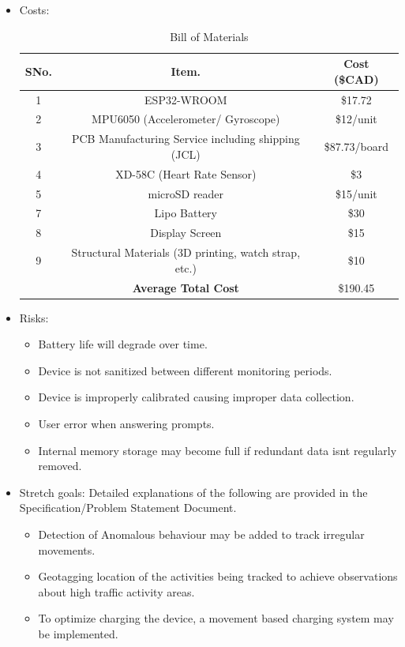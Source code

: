 \documentclass[12pt]{article}
\begin{document}
\begin{itemize}
\item Costs:
		\begin{center}
		\begin{table}[H]
		\caption{\label{bom}Bill of Materials}  
			\begin{tabular}{ |c|c|c| } 
				 \hline
				 	\textbf{SNo.} &  \textbf{Item.} &  \textbf{Cost (\$CAD)} \\ 
				 \hline
				 	1 & ESP32-WROOM											& \$17.72 \\ 
				 \hline		
				 	2 & MPU6050 (Accelerometer/ Gyroscope)						& \$12/unit \\ 
				 \hline
					3 & PCB Manufacturing Service including shipping (JCL) & \$87.73/board\\
				\hline
				 	4 & XD-58C (Heart Rate Sensor)								& \$3\\ 
				 \hline
				 	5 & microSD reader						& \$15/unit \\ 
				 \hline
				 	7 & Lipo Battery 											& \$30 \\ 
				 \hline
				 	8 &Display Screen										& \$15 \\ 
				 \hline
				 	9 & Structural Materials (3D printing, watch strap, etc.) 			& \$10 \\ 
				 \hline
				 	& \textbf{Average Total Cost}								& \$190.45 \\ 
				 \hline
			\end{tabular}
		\end{table}
		\end{center}
\newpage
\item Risks:
	\begin{itemize}
		\item Battery life will degrade over time.
		\item Device is not sanitized between different monitoring periods.
		\item Device is improperly calibrated causing improper data collection.
		\item User error when answering prompts.
		\item Internal memory storage may become full if redundant data isnt regularly removed.
	\end{itemize}

\item Stretch goals: Detailed explanations of the following are provided in the Specification/Problem Statement Document.
	\begin{itemize}
		\item Detection of Anomalous behaviour may be added to track irregular movements.
		\item Geotagging location of the activities being tracked to achieve observations about high traffic activity areas.
		\item To optimize charging the device, a movement based charging system may be implemented.
	\end{itemize}
\end{itemize}
\end{document}
